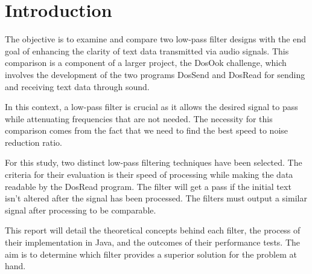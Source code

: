 \chapter{Introduction}

The objective is to examine and compare two low-pass filter designs with the end goal of enhancing the clarity of text data transmitted via audio signals. This comparison is a component of a larger project, the DosOok challenge, which involves the development of the two programs DosSend and DosRead for sending and receiving text data through sound.

In this context, a low-pass filter is crucial as it allows the desired signal to pass while attenuating frequencies that are not needed. The necessity for this comparison comes from the fact that we need to find the best speed to noise reduction ratio.

For this study, two distinct low-pass filtering techniques have been selected. The criteria for their evaluation is their speed of processing while making the data readable by the DosRead program. The filter will get a pass if the initial text isn't altered after the signal has been processed. The filters must output a similar signal after processing to be comparable.

This report will detail the theoretical concepts behind each filter, the process of their implementation in Java, and the outcomes of their performance tests. The aim is to determine which filter provides a superior solution for the problem at hand.